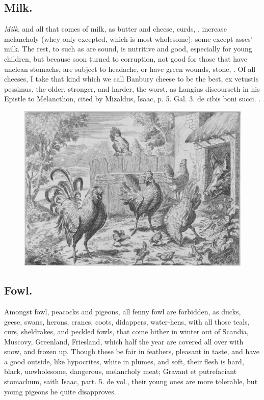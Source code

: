 {{\subsection{Milk.}
\emph{Milk}, and all that comes of milk, as butter and cheese, curds,
\etc{}, increase melancholy (whey only excepted, which is most wholesome):
some except asses' milk. The rest, to such as are sound, is
nutritive and good, especially for young children, but because soon
turned to corruption, not good for those that have unclean
stomachs, are subject to headache, or have green wounds, stone, \etc{}. Of
all cheeses, I take that kind which we call Banbury cheese to be the
best, ex vetustis pessimus, the older, stronger, and harder, the worst,
as Langius discourseth in his Epistle to Melancthon, cited by Mizaldus,
Isaac, p. 5. Gal. 3. de cibis boni succi. \etc{}.

\begin{figure}[H]
  \begingroup
  \centering
  \includegraphics[keepaspectratio,width=\textwidth]{figures/chickens-small.jpg}
  \label{fig:chickens}
\end{figure}

\subsection{Fowl.}
Amongst fowl, peacocks and pigeons, all fenny fowl are
forbidden, as ducks, geese, swans, herons, cranes, coots, didappers,
water-hens, with all those teals, curs, sheldrakes, and peckled fowls,
that come hither in winter out of Scandia, Muscovy, Greenland,
Friesland, which half the year are covered all over with snow, and
frozen up. Though these be fair in feathers, pleasant in taste, and
have a good outside, like hypocrites, white in plumes, and soft, their
flesh is hard, black, unwholesome, dangerous, melancholy meat; Gravant
et putrefaciant stomachum, saith Isaac, part. 5. de vol., their young
ones are more tolerable, but young pigeons he quite disapproves.

}}

